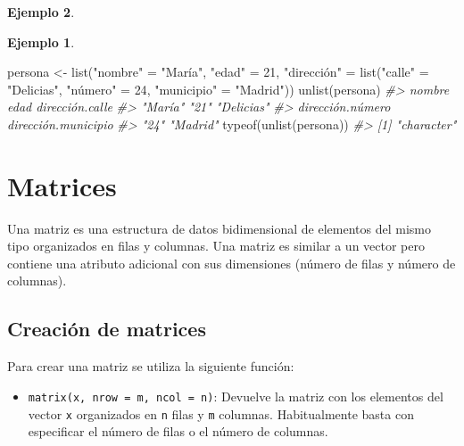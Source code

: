 \documentclass[
]{book}
\newenvironment{Shaded}{\begin{snugshade}}{\end{snugshade}}
\newcommand{\CommentTok}[1]{\textcolor[rgb]{0.56,0.35,0.01}{\textit{#1}}}
\newcommand{\DecValTok}[1]{\textcolor[rgb]{0.00,0.00,0.81}{#1}}
\newcommand{\FunctionTok}[1]{\textcolor[rgb]{0.00,0.00,0.00}{#1}}
\newcommand{\NormalTok}[1]{#1}
\newcommand{\OtherTok}[1]{\textcolor[rgb]{0.56,0.35,0.01}{#1}}
\newcommand{\StringTok}[1]{\textcolor[rgb]{0.31,0.60,0.02}{#1}}
\providecommand{\tightlist}{%
  \setlength{\itemsep}{0pt}\setlength{\parskip}{0pt}}
\theoremstyle{definition}
\theoremstyle{definition}
\newtheorem{example}{Ejemplo}[chapter]
\theoremstyle{definition}
\theoremstyle{definition}
\theoremstyle{remark}
\begin{document}
\begin{example}
\begin{example}
\begin{Shaded}
\begin{Highlighting}[]
\NormalTok{persona }\OtherTok{\textless{}{-}} \FunctionTok{list}\NormalTok{(}\StringTok{"nombre"} \OtherTok{=} \StringTok{"María"}\NormalTok{, }\StringTok{"edad"} \OtherTok{=} \DecValTok{21}\NormalTok{, }\StringTok{"dirección"} \OtherTok{=} \FunctionTok{list}\NormalTok{(}\StringTok{"calle"} \OtherTok{=} \StringTok{"Delicias"}\NormalTok{, }\StringTok{"número"} \OtherTok{=} \DecValTok{24}\NormalTok{, }\StringTok{"municipio"} \OtherTok{=} \StringTok{"Madrid"}\NormalTok{))}
\FunctionTok{unlist}\NormalTok{(persona)}
\CommentTok{\#\textgreater{}              nombre                edad     dirección.calle }
\CommentTok{\#\textgreater{}             "María"                "21"          "Delicias" }
\CommentTok{\#\textgreater{}    dirección.número dirección.municipio }
\CommentTok{\#\textgreater{}                "24"            "Madrid"}
\FunctionTok{typeof}\NormalTok{(}\FunctionTok{unlist}\NormalTok{(persona))}
\CommentTok{\#\textgreater{} [1] "character"}
\end{Highlighting}
\end{Shaded}

\end{example}

\hypertarget{matrices}{%
\section{Matrices}\label{matrices}}

Una matriz es una estructura de datos bidimensional de elementos del mismo tipo organizados en filas y columnas. Una matriz es similar a un vector pero contiene una atributo adicional con sus dimensiones (número de filas y número de columnas).

\hypertarget{creaciuxf3n-de-matrices}{%
\subsection{Creación de matrices}\label{creaciuxf3n-de-matrices}}

Para crear una matriz se utiliza la siguiente función:

\begin{itemize}
\tightlist
\item
  \texttt{matrix(x,\ nrow\ =\ m,\ ncol\ =\ n)}: Devuelve la matriz con los elementos del vector \texttt{x} organizados en \texttt{n} filas y \texttt{m} columnas. Habitualmente basta con especificar el número de filas o el número de columnas.
\end{itemize}


\end{example}
\end{document}
